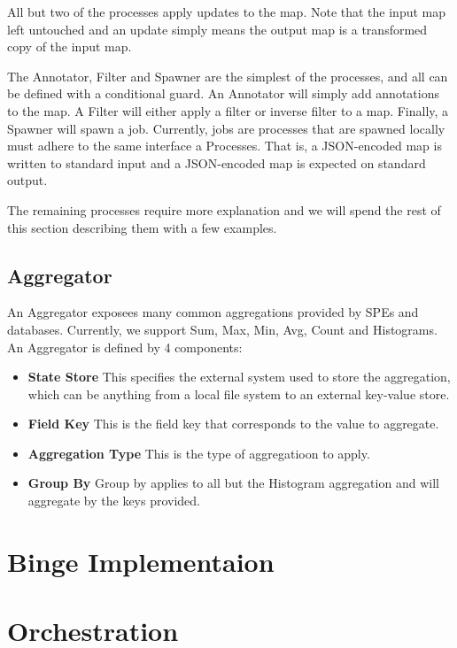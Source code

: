\documentclass[10pt,twocolumn]{article}
\begin{document}
All but two of the processes apply updates to the map.  Note that the input map
left untouched and an update simply means the output map is a transformed copy
of the input map.

The Annotator, Filter and Spawner are the simplest of the processes, and all
can be defined with a conditional guard.  An Annotator will simply add
annotations to the map.  A Filter will either apply a filter or inverse filter
to a map.  Finally, a Spawner will spawn a job.  Currently, jobs are processes
that are spawned locally must adhere to the same interface a Processes.  That
is, a JSON-encoded map is written to standard input and a JSON-encoded map is
expected on standard output.

The remaining processes require more explanation and we will spend the rest of
this section describing them with a few examples.

\subsection{Aggregator}

An Aggregator exposees many common aggregations provided by SPEs and databases.  Currently,
we support Sum, Max, Min, Avg, Count and Histograms.  An Aggregator is defined by 4 components:

\begin{itemize}
\item{{\bfseries State Store}} This specifies the external system used to store
the aggregation, which can be anything from a local file system to an external
key-value store.
\item{{\bfseries Field Key}} This is the field key that corresponds to the value to aggregate.
\item{{\bfseries Aggregation Type}} This is the type of aggregatioon to apply.
\item{{\bfseries Group By}} Group by applies to all but the Histogram aggregation and will aggregate by the keys provided.
\end{itemize}



\section{Binge Implementaion}\label{binge:implementation}
\section{Orchestration}\label{sec:orchestration}
\end{document}

